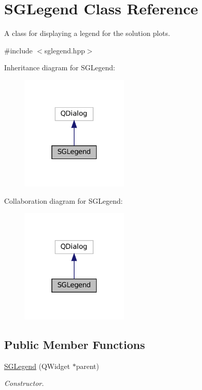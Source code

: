 \hypertarget{classSGLegend}{}\section{S\+G\+Legend Class Reference}
\label{classSGLegend}


A class for displaying a legend for the solution plots.  




{\ttfamily \#include $<$sglegend.\+hpp$>$}



Inheritance diagram for S\+G\+Legend\+:
\nopagebreak
\begin{figure}[H]
\begin{center}
\leavevmode
\includegraphics[width=145pt]{classSGLegend__inherit__graph}
\end{center}
\end{figure}


Collaboration diagram for S\+G\+Legend\+:
\nopagebreak
\begin{figure}[H]
\begin{center}
\leavevmode
\includegraphics[width=145pt]{classSGLegend__coll__graph}
\end{center}
\end{figure}
\subsection*{Public Member Functions}
\begin{DoxyCompactItemize}
\item 
\mbox{\label{classSGLegend_ac105f7004cae38c0834ae2e6a0920c9e}} 
\hyperlink{classSGLegend_ac105f7004cae38c0834ae2e6a0920c9e}{S\+G\+Legend} (Q\+Widget $\ast$parent)
\begin{DoxyCompactList}\small\item\em Constructor. \end{DoxyCompactList}\end{DoxyCompactItemize}


